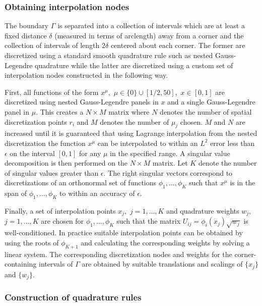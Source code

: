 
\subsubsection{Obtaining interpolation nodes}

The boundary $\Gamma$ is separated into a collection of intervals which are at least a fixed distance $\delta$  (measured in terms of arclength) away from a corner and the collection of intervals of length $2 \delta$ centered about each corner. The former are discretized using a standard smooth quadrature rule such as nested Gauss-Legendre quadrature while the latter are discretized using a custom set of interpolation nodes constructed in the following way.

First, all functions of the form $x^\mu,$ $\mu \in \{0\} \cup [1/2,50],$ $x \in [0,1]$ are discretized using nested Gauss-Legendre panels in $x$ and a single Gauss-Legendre panel in $\mu$. This creates a $N \times M$ matrix where $N$ denotes the number of spatial discretization points $r_i$ and $M$ denotes the number of $\mu_j$ chosen. $M$ and $N$ are increased until it is guaranteed that using Lagrange interpolation from the nested discretization the function $x^\mu$ can be interpolated to within an $L^2$ error less than $\epsilon$ on the interval $[0,1]$ for any $\mu$ in the specified range. A singular value decomposition is then performed on the $N\times M$ matrix. Let $K$ denote the number of singular values greater than $\epsilon.$ The right singular vectors correspond to discretizations of an orthonormal set of functions $\phi_1,\dots,\phi_K$ such that $x^\mu$ is in the span of $\phi_1,\dots,\phi_K$ to within an accuracy of $\epsilon.$

Finally, a set of interpolation points $x_j,$ $j=1,\dots,K$ and quadrature weights $w_j,$ $j=1,\dots,K$ are chosen for $\phi_1,\dots,\phi_K$ such that the matrix $U_{ij} = \phi_i(x_j) \sqrt{w_j}$ is well-conditioned. In practice suitable interpolation points can be obtained by using the roots of $\phi_{K+1}$ and calculating the corresponding weights by solving a linear system. The corresponding discretization nodes and weights for the corner-containing intervals of $\Gamma$ are obtained by suitable translations and scalings of $\{x_j\}$ and $\{w_j\}.$

\subsubsection{Construction of quadrature rules}


